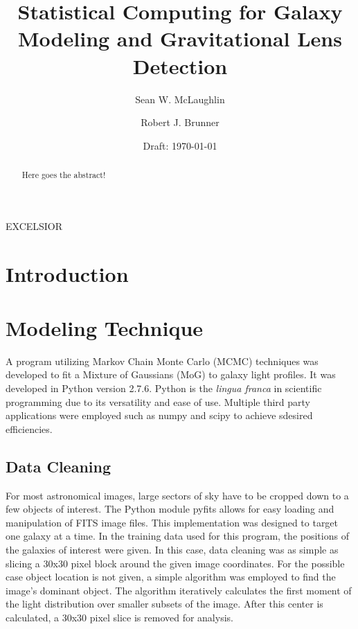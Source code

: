 \documentclass[authoryear, 12pt, 5p, times]{elsarticle}
\begin{document}
\begin{frontmatter}
\date{Draft: \today}

\title{Statistical Computing for Galaxy Modeling and Gravitational Lens Detection}
\author[uip]{Sean W. McLaughlin}
\author[ui]{Robert J. Brunner}
\address[uip]{Department of Physics, University of Illinois, Urbana, IL 61801}
\address[ui]{Department of Astronomy, University of Illinois, Urbana, IL 61801}


\begin{abstract}
Here goes the abstract!
\end{abstract}

\begin{keyword}
EXCELSIOR
\end{keyword}

\end{frontmatter}

\section{Introduction}\label{intro}

\section{Modeling Technique}\label{modeling}


A program utilizing Markov Chain Monte Carlo (MCMC) techniques was developed to fit a Mixture of Gaussians (MoG) to galaxy light profiles. It was developed in Python version 2.7.6. Python is the \textit{lingua franca} in scientific programming due to its versatility and ease of use. Multiple third party applications were employed such as numpy and scipy to achieve sdesired efficiencies. 

\subsection{Data Cleaning}

For most astronomical images, large sectors of sky have to be cropped down to a few objects of interest. The Python module pyfits allows for easy loading and manipulation of FITS image files. This implementation was designed to target one galaxy at a time. In the training data used for this program, the positions of the galaxies of interest were given. In this case, data cleaning was as simple as slicing a 30x30 pixel block around the given image coordinates. For the possible case object location is not given, a simple algorithm was employed to find the image's dominant object. The algorithm iteratively calculates the first moment of the light distribution over smaller subsets of the image. After this center is calculated, a 30x30 pixel slice is removed for analysis. 
\end{document}
